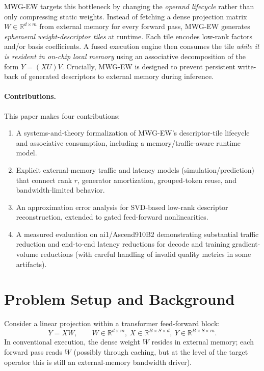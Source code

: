 \documentclass[11pt]{article}
\begin{document}
MWG-EW targets this bottleneck by changing the 
\emph{operand lifecycle} rather than only compressing static weights. Instead of fetching a dense projection matrix $W\in\mathbb{R}^{d\times m}$ from external memory for every forward pass, MWG-EW generates \emph{ephemeral} 
\emph{weight-descriptor tiles} at runtime. Each tile encodes low-rank factors and/or basis coefficients. A fused execution engine then consumes the tile \emph{while it is resident in on-chip local memory} using an associative decomposition of the form $Y=(XU)V$. Crucially, MWG-EW is designed to prevent persistent write-back of generated descriptors to external memory during inference.

\paragraph{Contributions.} 
This paper makes four contributions:
\begin{enumerate}[leftmargin=1.2em]
  \item A systems-and-theory formalization of MWG-EW’s descriptor-tile lifecycle and associative consumption, including a memory/traffic-aware runtime model.
  \item Explicit external-memory traffic and latency models (simulation/prediction) that connect rank $r$, generator amortization, grouped-token reuse, and bandwidth-limited behavior.
  \item An approximation error analysis for SVD-based low-rank descriptor reconstruction, extended to gated feed-forward nonlinearities.
  \item A measured evaluation on ai1/Ascend910B2 demonstrating substantial traffic reduction and end-to-end latency reductions for decode and training gradient-volume reductions (with careful handling of invalid quality metrics in some artifacts).
\end{enumerate}

\section{Problem Setup and Background}
Consider a linear projection within a transformer feed-forward block:
\begin{equation}
Y = XW,\qquad W\in\mathbb{R}^{d\times m},\ X\in\mathbb{R}^{B\times S\times d},\ Y\in\mathbb{R}^{B\times S\times m}.
\end{equation}
In conventional execution, the dense weight $W$ resides in external memory; each forward pass reads $W$ (possibly through caching, but at the level of the target operator this is still an external-memory bandwidth driver).
\end{document}
